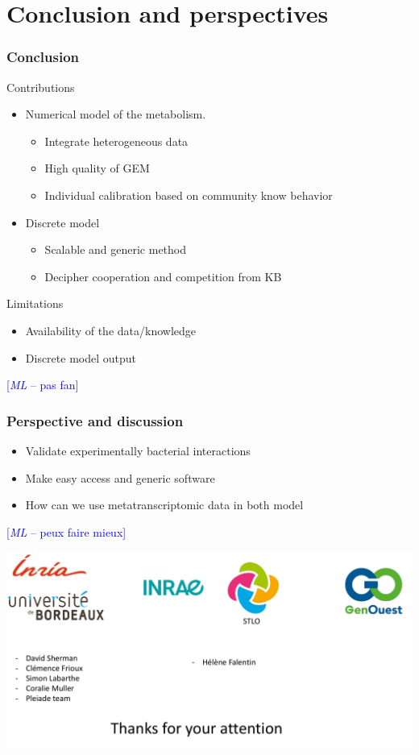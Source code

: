 \documentclass[8pt,usenames,dvipsnames]{beamer}
\newcommand{\ml}[1]{\textcolor{blue}{[\emph{ML} -- #1]}}
\begin{document}
\section{Conclusion and perspectives}
\begin{frame}
\frametitle{Conclusion}
\begin{block}{Contributions}
\begin{itemize}
\item Numerical model of the metabolism. 
\begin{itemize}
\item Integrate heterogeneous data
\item High quality of GEM
\item Individual calibration based on community know behavior
\end{itemize}
\end{itemize}
\begin{itemize}
\item Discrete model 
\begin{itemize}
\item Scalable and generic method
\item Decipher cooperation and competition from KB
\end{itemize}
\end{itemize}
\end{block}

\begin{block}{Limitations}
\begin{itemize}
\item Availability of the data/knowledge
\item Discrete model output 
\end{itemize}
\end{block}
\ml{pas fan}
\end{frame}

\begin{frame}
\frametitle{Perspective and discussion}

\begin{itemize}
\item Validate experimentally bacterial interactions 
\item Make easy access and generic software
\item How can we use metatranscriptomic data in both model 
\end{itemize}
\ml{peux faire mieux}
\end{frame}

\begin{frame}
\includegraphics[width=\textwidth]{figures/merci.pdf}
\end{frame}
\end{document}
